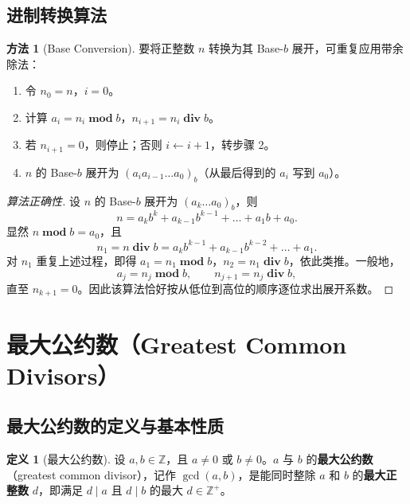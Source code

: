 \documentclass[UTF8,11pt,a4paper]{ctexbook}   %
\theoremstyle{definition}
\newtheorem{definition}{定义}[section]
\newtheorem{method}{方法}[section]
\begin{document}
\subsection{进制转换算法}

\begin{method}[Base Conversion]
要将正整数 $n$ 转换为其 Base-$b$ 展开，可重复应用带余除法：
\begin{enumerate}
    \item 令 $n_0 = n$，$i=0$。
    \item 计算 $a_i = n_i \;\mathbf{mod}\; b$，$n_{i+1} = n_i \;\mathbf{div}\; b$。
    \item 若 $n_{i+1} = 0$，则停止；否则 $i\leftarrow i+1$，转步骤 2。
    \item $n$ 的 Base-$b$ 展开为 $(a_i a_{i-1}\dots a_0)_b$（从最后得到的 $a_i$ 写到 $a_0$）。
\end{enumerate}
\end{method}

\begin{proof}[算法正确性]
设 $n$ 的 Base-$b$ 展开为 $(a_k\dots a_0)_b$，则
\[
n = a_k b^k + a_{k-1}b^{k-1} + \dots + a_1 b + a_0.
\]
显然 $n \;\mathbf{mod}\; b = a_0$，且
\[
n_1 = n \;\mathbf{div}\; b = a_k b^{k-1} + a_{k-1}b^{k-2} + \dots + a_1.
\]
对 $n_1$ 重复上述过程，即得 $a_1 = n_1 \;\mathbf{mod}\; b$，$n_2 = n_1 \;\mathbf{div}\; b$，依此类推。一般地，
\[
a_j = n_j \;\mathbf{mod}\; b,\qquad n_{j+1} = n_j \;\mathbf{div}\; b,
\]
直至 $n_{k+1}=0$。因此该算法恰好按从低位到高位的顺序逐位求出展开系数。
\end{proof}

\section{最大公约数（Greatest Common Divisors）}

\subsection{最大公约数的定义与基本性质}

\begin{definition}[最大公约数]
设 $a,b\in\mathbb{Z}$，且 $a\neq 0$ 或 $b\neq 0$。$a$ 与 $b$ 的\textbf{最大公约数}（greatest common divisor），记作 $\gcd(a,b)$，是能同时整除 $a$ 和 $b$ 的\textbf{最大正整数} $d$，即满足 $d\mid a$ 且 $d\mid b$ 的最大 $d\in\mathbb{Z}^+$。
\end{definition}
\end{document}
